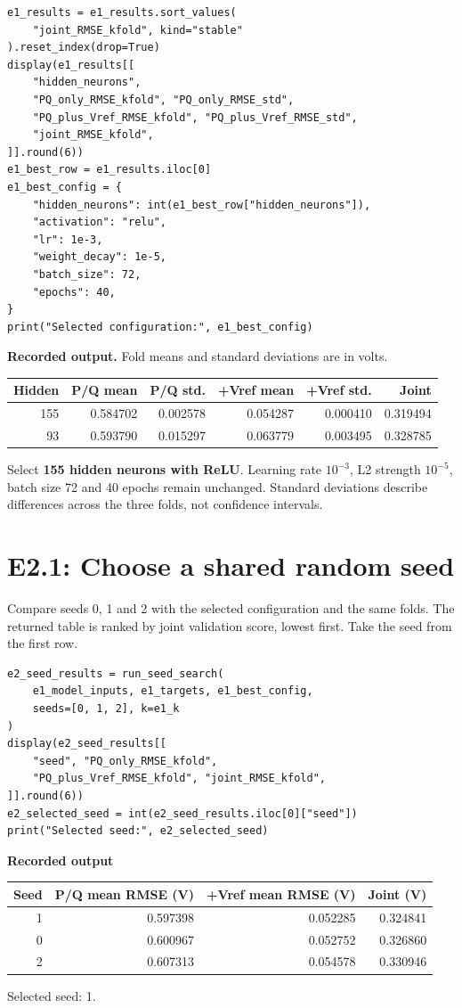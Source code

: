 \documentclass[11pt,a4paper]{article}
\begin{document}
\begin{lstlisting}
e1_results = e1_results.sort_values(
    "joint_RMSE_kfold", kind="stable"
).reset_index(drop=True)
display(e1_results[[
    "hidden_neurons",
    "PQ_only_RMSE_kfold", "PQ_only_RMSE_std",
    "PQ_plus_Vref_RMSE_kfold", "PQ_plus_Vref_RMSE_std",
    "joint_RMSE_kfold",
]].round(6))
e1_best_row = e1_results.iloc[0]
e1_best_config = {
    "hidden_neurons": int(e1_best_row["hidden_neurons"]),
    "activation": "relu",
    "lr": 1e-3,
    "weight_decay": 1e-5,
    "batch_size": 72,
    "epochs": 40,
}
print("Selected configuration:", e1_best_config)
\end{lstlisting}

\textbf{Recorded output.} Fold means and standard deviations are in volts.
\begin{center}
{\small
\begin{tabular}{rrrrrr}
\toprule
Hidden & P/Q mean & P/Q std. & +Vref mean & +Vref std. & Joint \\
\midrule
155 & 0.584702 & 0.002578 & 0.054287 & 0.000410 & 0.319494 \\
93 & 0.593790 & 0.015297 & 0.063779 & 0.003495 & 0.328785 \\
\bottomrule
\end{tabular}}
\end{center}
Select \textbf{155 hidden neurons with ReLU}. Learning rate $10^{-3}$,
L2 strength $10^{-5}$, batch size 72 and 40 epochs remain unchanged.
Standard deviations describe differences across the three folds,
not confidence intervals.

\clearpage
\section*{E2.1: Choose a shared random seed}
Compare seeds 0, 1 and 2 with the selected configuration and the same folds.
The returned table is ranked by joint validation score, lowest first.
Take the seed from the first row.

\begin{lstlisting}
e2_seed_results = run_seed_search(
    e1_model_inputs, e1_targets, e1_best_config,
    seeds=[0, 1, 2], k=e1_k
)
display(e2_seed_results[[
    "seed", "PQ_only_RMSE_kfold",
    "PQ_plus_Vref_RMSE_kfold", "joint_RMSE_kfold",
]].round(6))
e2_selected_seed = int(e2_seed_results.iloc[0]["seed"])
print("Selected seed:", e2_selected_seed)
\end{lstlisting}

\textbf{Recorded output}
\begin{center}
\begin{tabular}{rrrr}
\toprule
Seed & P/Q mean RMSE (V) & +Vref mean RMSE (V) & Joint (V) \\
\midrule
1 & 0.597398 & 0.052285 & 0.324841 \\
0 & 0.600967 & 0.052752 & 0.326860 \\
2 & 0.607313 & 0.054578 & 0.330946 \\
\bottomrule
\end{tabular}
\end{center}
Selected seed: 1.
\end{document}
